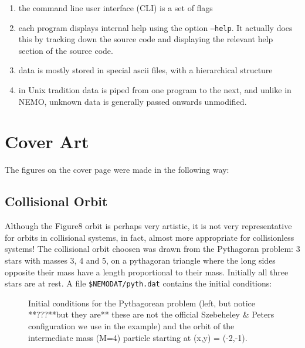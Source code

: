\begin{itemize}
\begin{itemize}
\begin{enumerate}
\item
the command line user interface (CLI) is a set of flags

\item
each program displays internal help using the option {\tt --help}.
It actually does this by tracking down the source code
and displaying the relevant help section of the source code.

\item
data is mostly stored in special ascii files, with a hierarchical structure

\item
in Unix tradition data is piped from one program to the next, and unlike
in NEMO, unknown data is generally passed onwards unmodified.

\end{enumerate}

\chapter                {Cover Art}

The figures on the cover page were made in the following way:

\section{Collisional Orbit}
\label{s:pyth} 

Although the Figure8 orbit is perhaps very artistic, it is not very representative
for orbits in collisional systems, in fact, almost more appropriate
for collisionless systems!
The collisional orbit choosen was drawn from the Pythagoran problem:
3 stars with masses 3, 4 and 5, on a pythagoran triangle where the
long sides opposite their mass have a length proportional to 
their mass. Initially
all three stars are at rest. A file {\tt \$NEMODAT/pyth.dat} contains
the initial conditions:


\begin{figure}[t]
\caption[Pythagorean problem]
{Initial conditions for the Pythagorean problem (left, but notice **???**but they are**
these are not the official Szebeheley \& Peters configuration we use
in the example)
and the orbit of the intermediate mass (M=4) particle starting
at (x,y) = (-2,-1).}
\end{figure}




\end{itemize}
\end{itemize}
